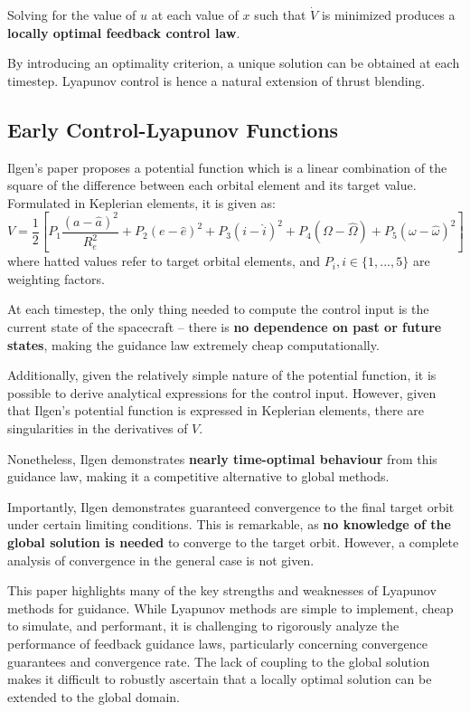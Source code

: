 Solving for the value of \(u\) at each value of \(x\) such that \(\dot{V}\) is minimized produces a \textbf{locally optimal feedback control law}.

By introducing an optimality criterion, a unique solution can be obtained at each timestep. Lyapunov control is hence a natural extension of thrust blending.

\subsection{Early Control-Lyapunov Functions}

Ilgen's paper proposes a potential function which is a linear combination of the square of the difference between each orbital element and its target value. Formulated in Keplerian elements, it is given as:
\begin{equation}
  V = \frac{1}{2} \left[P_1 \frac{(a - \hat{a})^2}{R_e^2} + P_2 (e - \hat{e})^2 + P_3 (i - \hat{i})^2 + P_4 (\Omega - \hat{\Omega}) + P_5 (\omega - \hat{\omega})^2  \right]
  \label{eq:ilgen_potential}
\end{equation}
where hatted values refer to target orbital elements, and \(P_i, i \in \{1, ..., 5\}\) are weighting factors.

At each timestep, the only thing needed to compute the control input is the current state of the spacecraft -- there is \textbf{no dependence on past or future states}, making the guidance law extremely cheap computationally.

Additionally, given the relatively simple nature of the potential function, it is possible to derive analytical expressions for the control input. However, given that Ilgen's potential function is expressed in Keplerian elements, there are singularities in the derivatives of \(V\).

Nonetheless, Ilgen demonstrates \textbf{nearly time-optimal behaviour} from this guidance law, making it a competitive alternative to global methods.

Importantly, Ilgen demonstrates guaranteed convergence to the final target orbit under certain limiting conditions. This is remarkable, as \textbf{no knowledge of the global solution is needed} to converge to the target orbit. However, a complete analysis of convergence in the general case is not given.

This paper highlights many of the key strengths and weaknesses of Lyapunov methods for guidance. While Lyapunov methods are simple to implement, cheap to simulate, and performant, it is challenging to rigorously analyze the performance of feedback guidance laws, particularly concerning convergence guarantees and convergence rate. The lack of coupling to the global solution makes it difficult to robustly ascertain that a locally optimal solution can be extended to the global domain.

